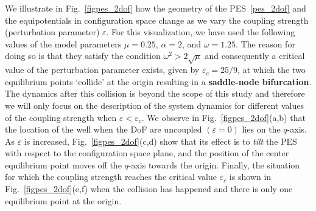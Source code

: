 \documentclass{ws-ijbc}
\begin{document}
We illustrate in Fig.~\ref{figpes_2dof} how the geometry of the PES~\eqref{pes_2dof} and the equipotentials in configuration space change as we vary the coupling strength (perturbation parameter) $\varepsilon$. For this visualization, we have used the following values of the model parameters $\mu = 0.25$, $\alpha = 2$, and $\omega = 1.25$. The reason for doing so is that they satisfy the condition $\omega^2 > 2\sqrt{\mu}$ and consequently a critical value of the perturbation parameter exists, given by $\varepsilon_c = 25/9$, at which the two equilibrium points `collide' at the origin resulting in a \textbf{saddle-node bifurcation}. The dynamics after this collision is beyond the scope of this study and therefore we will only focus on the description of the system dynamics for different values of the coupling strength when $\varepsilon < \varepsilon_c$.  We observe in Fig.~\ref{figpes_2dof}(a,b) that the location of the well when the DoF are uncoupled $(\varepsilon = 0)$ lies on the $q$-axis. As $\varepsilon$ is increased, Fig.~\ref{figpes_2dof}(c,d) show that its effect is to \textit{tilt} the PES with respect to the configuration space plane, and the position of the center equilibrium point moves off the $q$-axis towards the origin. Finally, the situation for which the coupling strength reaches the critical value $\varepsilon_c$  is shown in Fig.~\ref{figpes_2dof}(e,f) when the collision has happened and there is only one equilibrium point at the origin.
\end{document}
